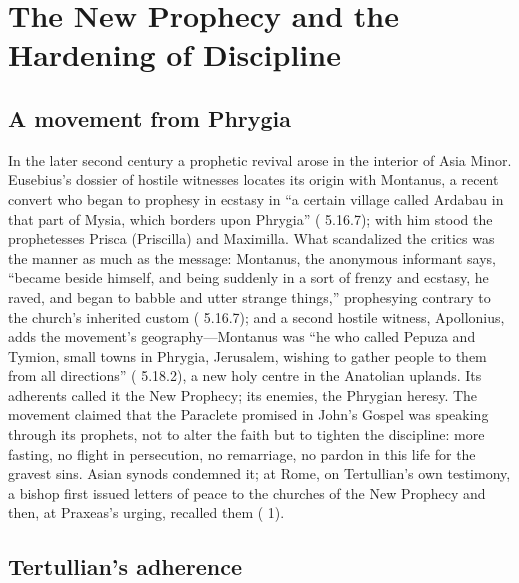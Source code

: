 \section{The New Prophecy and the Hardening of Discipline}

\subsection{A movement from Phrygia}

In the later second century a prophetic revival arose in the interior of Asia
Minor. Eusebius's dossier of hostile witnesses locates its origin with
Montanus, a recent convert who began to prophesy in ecstasy in ``a certain
village called Ardabau in that part of Mysia, which borders upon Phrygia''
( 5.16.7); with him stood the prophetesses Prisca
(Priscilla) and Maximilla. What scandalized the critics was the manner as
much as the message: Montanus, the anonymous informant says, ``became beside
himself, and being suddenly in a sort of frenzy and ecstasy, he raved, and
began to babble and utter strange things,'' prophesying contrary to the
church's inherited custom ( 5.16.7); and a second
hostile witness, Apollonius, adds the movement's geography---Montanus was
``he who called Pepuza and Tymion, small towns in Phrygia, Jerusalem,
wishing to gather people to them from all directions'' ( 5.18.2), a new holy centre in the Anatolian uplands. Its adherents
called it the New Prophecy; its enemies, the Phrygian heresy. The movement claimed that the Paraclete promised
in John's Gospel was speaking through its prophets, not to alter the faith but
to tighten the discipline: more fasting, no flight in persecution, no
remarriage, no pardon in this life for the gravest sins. Asian synods
condemned it; at Rome, on Tertullian's own testimony, a bishop first issued
letters of peace to the churches of the New Prophecy and then, at Praxeas's
urging, recalled them ( 1).

\subsection{Tertullian's adherence}

